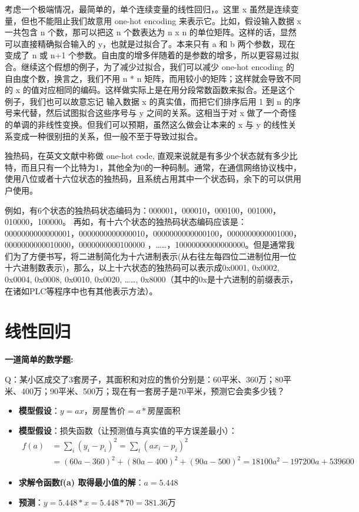 \documentclass[10pt,a4paper]{ctexbook}
\begin{document}
考虑一个极端情况，最简单的，单个连续变量的线性回归，。这里 x 虽然是连续变量，但也不能阻止我们故意用 one-hot encoding 来表示它。比如，假设输入数据 x 一共包含 n 个数，那可以把这 n 个数表达为 n x n 的单位矩阵。这样的话，显然可以直接精确拟合输入的 y，也就是过拟合了。本来只有 a 和 b 两个参数，现在变成了 n 或 n+1 个参数。自由度的增多伴随着的是参数的增多，所以更容易过拟合。继续这个假想的例子，为了减少过拟合，我们可以减少 one-hot encoding 的自由度个数，换言之，我们不用 n * n 矩阵，而用较小的矩阵；这样就会导致不同的 x 的值对应相同的编码。这样做实际上是在用分段常数函数来拟合。还是这个例子，我们也可以故意忘记 输入数据 x 的真实值，而把它们排序后用 1 到 n 的序号来代替，然后试图拟合这些序号与 y 之间的关系。这相当于对 x 做了一个奇怪的单调的非线性变换。但我们可以预期，虽然这么做会让本来的 x 与 y 的线性关系变成一种很别扭的关系，但一般不至于导致过拟合。



独热码，在英文文献中称做 one-hot code, 直观来说就是有多少个状态就有多少比特，而且只有一个比特为1，其他全为0的一种码制。通常，在通信网络协议栈中，使用八位或者十六位状态的独热码，且系统占用其中一个状态码，余下的可以供用户使用。

例如，有6个状态的独热码状态编码为：000001，000010，000100，001000，010000，100000。
再如，有十六个状态的独热码状态编码应该是：0000000000000001，0000000000000010，0000000000000100，0000000000001000，0000000000010000，0000000000100000 ，……，10000000000000000。但是通常我们为了方便书写，将二进制简化为十六进制表示(从右往左每四位二进制位用一位十六进制数表示)，那么，以上十六状态的独热码可以表示成0x0001, 0x0002, 0x0004, 0x0008, 0x0010, 0x0020, ……, 0x8000（其中的0x是十六进制的前缀表示，在诸如PLC等程序中也有其他表示方法）。



\section{线性回归}
\textbf{\large{一道简单的数学题: }}

Q：某小区成交了3套房子，其面积和对应的售价分别是：60平米、360万；80平米、400万；90平米、500万；现在有一套房子是70平米，预测它会卖多少钱？
\begin{itemize}
\item \textbf{模型假设}：$y=ax$，$房屋售价=a * 房屋面积$
\item \textbf{模型假设}：损失函数（让预测值与真实值的平方误差最小）：
\begin{align*}
f(a)&=\sum\limits_{i}{(y_{i}-p_{i})^2} =\sum\limits_{t}{(ax_{i}-p_{i})^2} \\
    &=(60a-360)^2+(80a-400)^2+(90a-500)^2=18100a^{2}-197200a+539600
\end{align*}
\item \textbf{求解令函数f(a) 取得最小值的解}：$a=5.448$
\item \textbf{预测}：$y=5.448*x=5.448*70=381.36$万 
\end{itemize}
\end{document}
